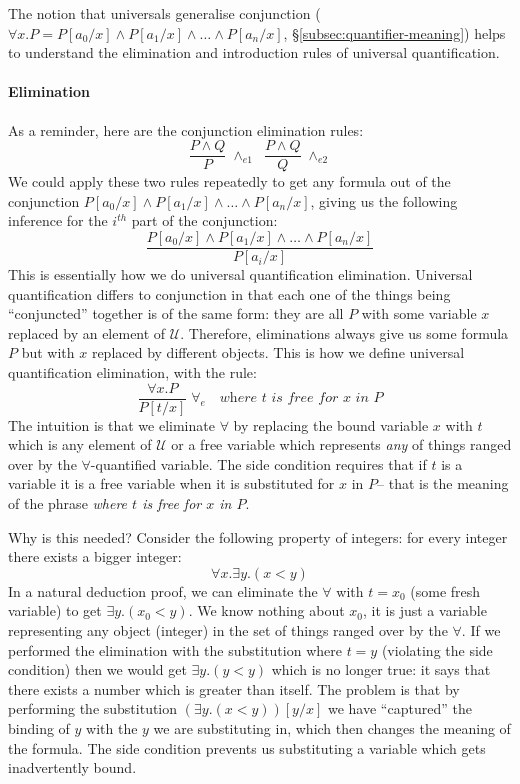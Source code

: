 The notion that universals generalise conjunction
($\forall x . P = P[a_0/x] \wedge P[a_1/x] \wedge
\ldots \wedge P[a_{n}/x]$, \S\ref{subsec:quantifier-meaning})
helps to understand the elimination and introduction rules of universal
quantification.

\paragraph{Elimination} As a reminder, here
are the conjunction elimination rules:
%
\begin{equation*}
\dfrac{P \wedge Q}
        {P} \; {\wedge_{e1}}
\;\;
\dfrac{P \wedge Q}
  {Q} \; {\wedge_{e2}}
\end{equation*}
%
We could apply these two
rules repeatedly to get any formula out of the conjunction
$P[a_0/x] \wedge P[a_1/x] \wedge
\ldots \wedge P[a_{n}/x]$, giving us the following inference for
the $i^{th}$ part of the conjunction:
%
\begin{equation*}
  \dfrac{P[a_0/x] \wedge P[a_1/x] \wedge \ldots \wedge P[a_{n}/x]}
  {P[a_i/x]}
\end{equation*}
%
This is essentially how we do universal quantification elimination.
Universal quantification differs to conjunction in that each one of the things
being ``conjuncted'' together is of the same form: they are all $P$
with some variable $x$ replaced by an element of $\mathcal{U}$.
Therefore, eliminations
always give us some formula $P$ but with $x$ replaced by different objects. This is how
we define universal quantification elimination, with the rule:
%
\begin{equation*}
  \dfrac{\forall x . P}
  {P [t/x]} \; {\forall_e} \quad \textit{where $t$ is free for $x$ in $P$}
\end{equation*}
%
The intuition is that we eliminate $\forall$ by replacing the bound
variable $x$ with $t$ which is any element of $\mathcal{U}$ or a
 free variable which represents
\emph{any} of things ranged over by the $\forall$-quantified variable.
The side condition requires that if $t$ is a variable it is a free variable
 when it is substituted for $x$ in $P$-- that is the meaning of the
 phrase \emph{where $t$ is free for $x$ in $P$}.

 Why is this needed? Consider the following property of integers: for
every integer there exists a bigger integer:
%
\begin{equation*}
  \forall x . \exists y . (x < y)
\end{equation*}
In a natural deduction proof, we can eliminate the $\forall$ with
$t = x_0$ (some fresh variable) to get $\exists y . (x_0 < y)$. We
know nothing about $x_0$, it is just a variable representing any
object (integer) in the set of things ranged over by the $\forall$.
If we performed the elimination with the substitution where
$t = y$ (violating the side condition) then we would get
$\exists y . (y < y)$ which is no longer true: it says that there
exists a number which is greater than itself. The problem is that by
performing the substitution $(\exists y. (x < y))[y/x]$ we have
``captured'' the binding of $y$ with the $y$ we are substituting in,
which then changes the meaning of the formula. The
side condition prevents us substituting a variable which
gets inadvertently bound.

